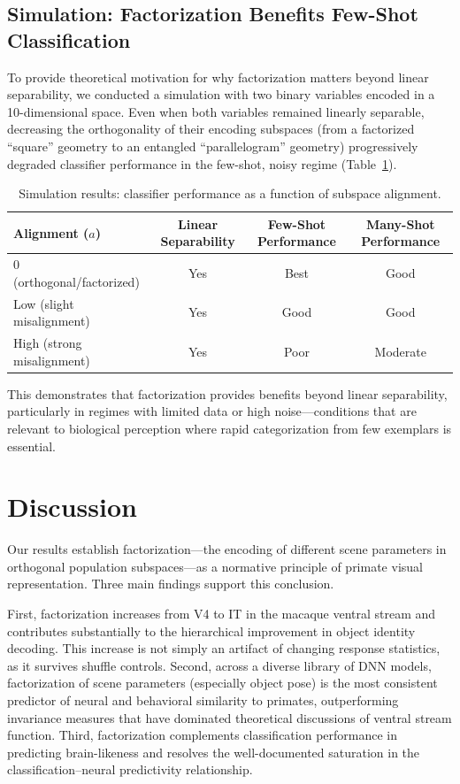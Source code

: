 \documentclass[11pt]{article}
\begin{document}
\subsection{Simulation: Factorization Benefits Few-Shot Classification}

To provide theoretical motivation for why factorization matters beyond linear separability, we conducted a simulation with two binary variables encoded in a 10-dimensional space. Even when both variables remained linearly separable, decreasing the orthogonality of their encoding subspaces (from a factorized ``square'' geometry to an entangled ``parallelogram'' geometry) progressively degraded classifier performance in the few-shot, noisy regime (Table~\ref{tab:sim}).

\begin{table}[htbp]
\centering
\caption{Simulation results: classifier performance as a function of subspace alignment.}
\label{tab:sim}
\begin{tabular}{lccc}
\toprule
Alignment ($a$) & Linear Separability & Few-Shot Performance & Many-Shot Performance \\
\midrule
0 (orthogonal/factorized) & Yes & Best & Good \\
Low (slight misalignment) & Yes & Good & Good \\
High (strong misalignment) & Yes & Poor & Moderate \\
\bottomrule
\end{tabular}
\end{table}

This demonstrates that factorization provides benefits beyond linear separability, particularly in regimes with limited data or high noise---conditions that are relevant to biological perception where rapid categorization from few exemplars is essential.

\section{Discussion}

Our results establish factorization---the encoding of different scene parameters in orthogonal population subspaces---as a normative principle of primate visual representation. Three main findings support this conclusion.

First, factorization increases from V4 to IT in the macaque ventral stream and contributes substantially to the hierarchical improvement in object identity decoding. This increase is not simply an artifact of changing response statistics, as it survives shuffle controls. Second, across a diverse library of DNN models, factorization of scene parameters (especially object pose) is the most consistent predictor of neural and behavioral similarity to primates, outperforming invariance measures that have dominated theoretical discussions of ventral stream function. Third, factorization complements classification performance in predicting brain-likeness and resolves the well-documented saturation in the classification--neural predictivity relationship.
\end{document}
